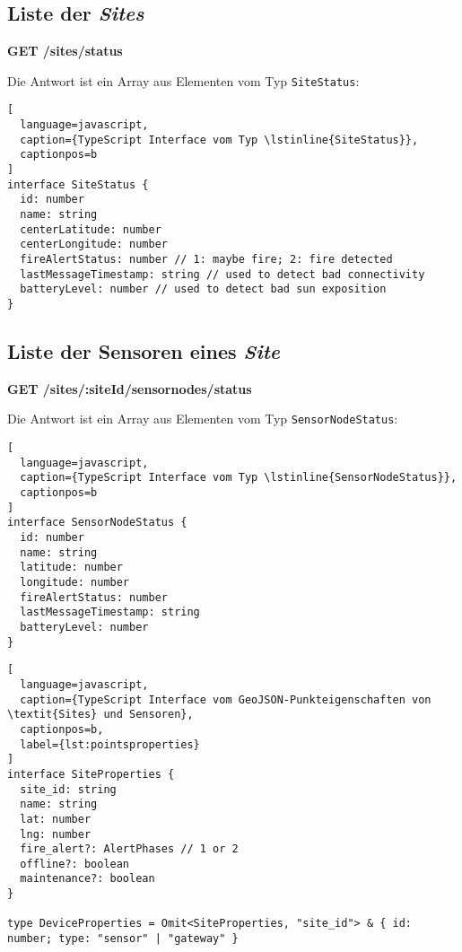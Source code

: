 \subsection{Liste der \textit{Sites}}

\textbf{GET /sites/status}

Die Antwort ist ein Array aus Elementen vom Typ \lstinline{SiteStatus}:

\begin{lstlisting}[
  language=javascript,
  caption={TypeScript Interface vom Typ \lstinline{SiteStatus}},
  captionpos=b
]
interface SiteStatus {
  id: number
  name: string
  centerLatitude: number
  centerLongitude: number
  fireAlertStatus: number // 1: maybe fire; 2: fire detected
  lastMessageTimestamp: string // used to detect bad connectivity
  batteryLevel: number // used to detect bad sun exposition
}
\end{lstlisting}

\subsection{Liste der Sensoren eines \textit{Site}}

\textbf{GET /sites/:siteId/sensornodes/status}

Die Antwort ist ein Array aus Elementen vom Typ \lstinline{SensorNodeStatus}:

\begin{lstlisting}[
  language=javascript,
  caption={TypeScript Interface vom Typ \lstinline{SensorNodeStatus}},
  captionpos=b
]
interface SensorNodeStatus {
  id: number
  name: string
  latitude: number
  longitude: number
  fireAlertStatus: number
  lastMessageTimestamp: string
  batteryLevel: number
}
\end{lstlisting}

\begin{lstlisting}[
  language=javascript,
  caption={TypeScript Interface vom GeoJSON-Punkteigenschaften von \textit{Sites} und Sensoren},
  captionpos=b,
  label={lst:pointsproperties}
]
interface SiteProperties {
  site_id: string
  name: string
  lat: number
  lng: number
  fire_alert?: AlertPhases // 1 or 2
  offline?: boolean
  maintenance?: boolean
}

type DeviceProperties = Omit<SiteProperties, "site_id"> & { id: number; type: "sensor" | "gateway" }
\end{lstlisting}